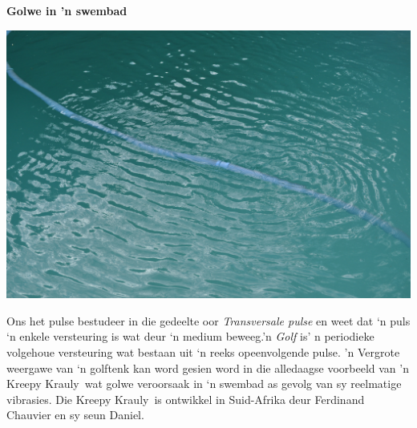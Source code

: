             \nopagebreak
\begin{minipage}{.5\textwidth}
\textbf{Golwe in 'n swembad}\par
 \includegraphics[width=.8\textwidth]{photos/kreepykrawly.jpg}
\end{minipage}
\begin{minipage}{.5\textwidth}  
Ons het pulse bestudeer in die gedeelte oor \textit{Transversale pulse} en weet dat ‘n puls ‘n enkele versteuring is wat deur ‘n medium beweeg.'n \textsl{Golf} is' n periodieke volgehoue versteuring wat bestaan uit ‘n reeks opeenvolgende pulse. 'n Vergrote weergawe van ‘n golftenk kan word  gesien word in die alledaagse voorbeeld van 'n Kreepy Krauly\textregistered\ wat golwe veroorsaak in ‘n swembad as gevolg van sy reelmatige vibrasies. Die Kreepy Krauly\textregistered\ is ontwikkel in Suid-Afrika deur Ferdinand Chauvier en sy seun Daniel.\\
\end{minipage}
